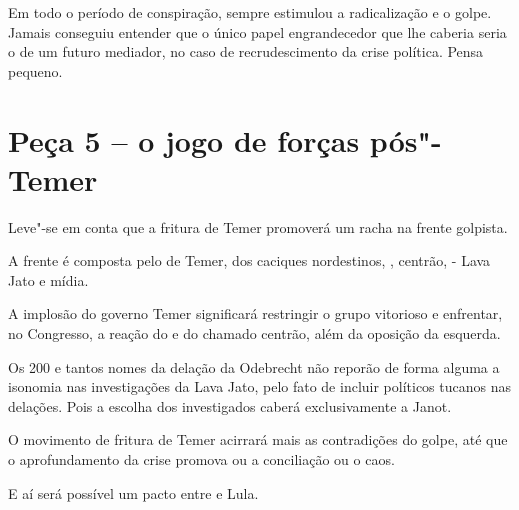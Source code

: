Em todo o período de conspiração,  sempre estimulou a radicalização e
o golpe. Jamais conseguiu entender que o único papel engrandecedor que
lhe caberia seria o de um futuro mediador, no caso de recrudescimento da
crise política. Pensa pequeno.

\section{Peça 5 -- o jogo de forças pós"-Temer}

Leve"-se em conta que a fritura de Temer promoverá um racha na frente
golpista.

A frente é composta pelo  de Temer,  dos caciques nordestinos,
, centrão, - Lava Jato e mídia.

A implosão do governo Temer significará restringir o grupo vitorioso e
enfrentar, no Congresso, a reação do  e do chamado centrão, além da
oposição da esquerda.

Os 200 e tantos nomes da delação da Odebrecht não reporão de forma
alguma a isonomia nas investigações da Lava Jato, pelo fato de incluir
políticos tucanos nas delações. Pois a escolha dos investigados caberá
exclusivamente a Janot.

O movimento de fritura de Temer acirrará mais as contradições do golpe,
até que o aprofundamento da crise promova ou a conciliação ou o caos.

E aí será possível um pacto entre  e Lula.
